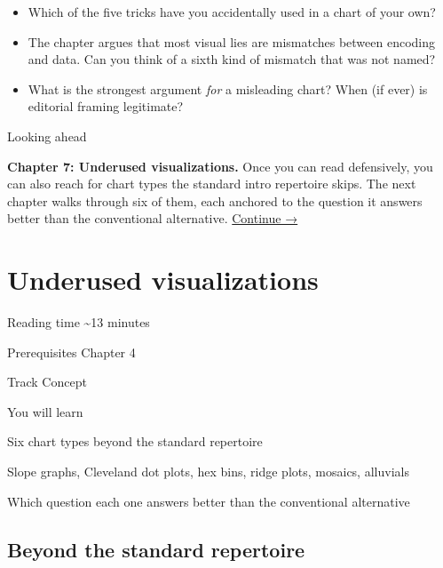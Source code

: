 \documentclass[
  letterpaper,
  11pt,
  twoside,
  openany]{scrbook}
\providecommand{\tightlist}{%
  \setlength{\itemsep}{0pt}\setlength{\parskip}{0pt}}
\begin{document}
\begin{tcolorbox}[enhanced jigsaw, arc=.35mm, bottomrule=.15mm, bottomtitle=1mm, breakable, colback=white, colbacktitle=quarto-callout-caution-color!10!white, colframe=quarto-callout-caution-color-frame, coltitle=black, left=2mm, leftrule=.75mm, opacityback=0, opacitybacktitle=0.6, rightrule=.15mm, title=\textcolor{quarto-callout-caution-color}{\faFire}\hspace{0.5em}{Reflect before moving on}, titlerule=0mm, toprule=.15mm, toptitle=1mm]

\begin{itemize}
\tightlist
\item
  Which of the five tricks have you accidentally used in a chart of your
  own?
\item
  The chapter argues that most visual lies are mismatches between
  encoding and data. Can you think of a sixth kind of mismatch that was
  not named?
\item
  What is the strongest argument \emph{for} a misleading chart? When (if
  ever) is editorial framing legitimate?
\end{itemize}

\end{tcolorbox}

{Looking ahead}

\textbf{Chapter 7: Underused visualizations.} Once you can read
defensively, you can also reach for chart types the standard intro
repertoire skips. The next chapter walks through six of them, each
anchored to the question it answers better than the conventional
alternative. \href{07-underused-visualizations.qmd}{Continue →}

\chapter{Underused visualizations}\label{underused-visualizations}

{Reading time} {\textasciitilde13 minutes}

{Prerequisites} {Chapter 4}

{Track} {Concept}

{You will learn}

Six chart types beyond the standard repertoire

Slope graphs, Cleveland dot plots, hex bins, ridge plots, mosaics,
alluvials

Which question each one answers better than the conventional alternative

\section{Beyond the standard
repertoire}\label{beyond-the-standard-repertoire}
\end{document}
